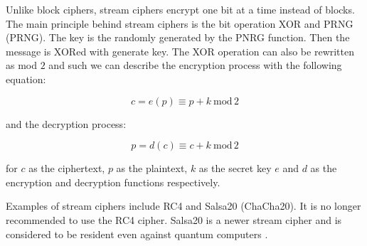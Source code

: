 Unlike block ciphers, stream ciphers encrypt one bit at a time instead of blocks. The main principle behind stream ciphers is the bit operation XOR and PRNG (\acl{PRNG}). The key is the randomly generated by the PNRG function. Then the message is XORed with generate key. The XOR operation can also be rewritten as mod $2$ and such we can describe the encryption process with the following equation:

\begin{equation}
  c = e(p)\equiv p + k\ \mathrm{mod}\,2
\end{equation}

\noindent and the decryption process:

\begin{equation}
  p = d(c)\equiv c + k\ \mathrm{mod}\,2
\end{equation}

\noindent for $c$ as the ciphertext, $p$ as the plaintext, $k$ as the secret key $e$ and $d$ as the encryption and decryption functions respectively\cite{Paar2010}.

Examples of stream ciphers include RC4 and Salsa20 (ChaCha20). It is no longer recommended to use the RC4 cipher\cite{Ristic2014}. Salsa20 is a newer stream cipher and is considered to be resident even against quantum computers \cite{Bernstein149}.
